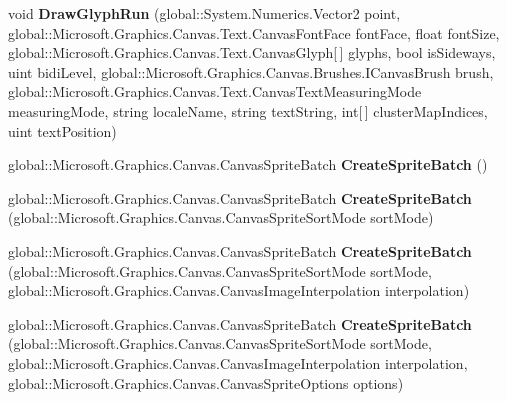 \begin{DoxyCompactItemize}
\item 
\mbox{\label{class_microsoft_1_1_graphics_1_1_canvas_1_1_canvas_drawing_session_a7141cc7174254e70e51c28b9e7c914bf}} 
void {\bfseries Draw\+Glyph\+Run} (global\+::\+System.\+Numerics.\+Vector2 point, global\+::\+Microsoft.\+Graphics.\+Canvas.\+Text.\+Canvas\+Font\+Face font\+Face, float font\+Size, global\+::\+Microsoft.\+Graphics.\+Canvas.\+Text.\+Canvas\+Glyph\mbox{[}$\,$\mbox{]} glyphs, bool is\+Sideways, uint bidi\+Level, global\+::\+Microsoft.\+Graphics.\+Canvas.\+Brushes.\+I\+Canvas\+Brush brush, global\+::\+Microsoft.\+Graphics.\+Canvas.\+Text.\+Canvas\+Text\+Measuring\+Mode measuring\+Mode, string locale\+Name, string text\+String, int\mbox{[}$\,$\mbox{]} cluster\+Map\+Indices, uint text\+Position)
\item 
\mbox{\label{class_microsoft_1_1_graphics_1_1_canvas_1_1_canvas_drawing_session_a1538a697e0b86bca6f7c150533eb5171}} 
global\+::\+Microsoft.\+Graphics.\+Canvas.\+Canvas\+Sprite\+Batch {\bfseries Create\+Sprite\+Batch} ()
\item 
\mbox{\label{class_microsoft_1_1_graphics_1_1_canvas_1_1_canvas_drawing_session_a2a90318aeea5371614e41e51b53a0a02}} 
global\+::\+Microsoft.\+Graphics.\+Canvas.\+Canvas\+Sprite\+Batch {\bfseries Create\+Sprite\+Batch} (global\+::\+Microsoft.\+Graphics.\+Canvas.\+Canvas\+Sprite\+Sort\+Mode sort\+Mode)
\item 
\mbox{\label{class_microsoft_1_1_graphics_1_1_canvas_1_1_canvas_drawing_session_af03c7fa9272225a4aa04141c79381dbe}} 
global\+::\+Microsoft.\+Graphics.\+Canvas.\+Canvas\+Sprite\+Batch {\bfseries Create\+Sprite\+Batch} (global\+::\+Microsoft.\+Graphics.\+Canvas.\+Canvas\+Sprite\+Sort\+Mode sort\+Mode, global\+::\+Microsoft.\+Graphics.\+Canvas.\+Canvas\+Image\+Interpolation interpolation)
\item 
\mbox{\label{class_microsoft_1_1_graphics_1_1_canvas_1_1_canvas_drawing_session_a4a164e8f14dacae16a1a20511ade806d}} 
global\+::\+Microsoft.\+Graphics.\+Canvas.\+Canvas\+Sprite\+Batch {\bfseries Create\+Sprite\+Batch} (global\+::\+Microsoft.\+Graphics.\+Canvas.\+Canvas\+Sprite\+Sort\+Mode sort\+Mode, global\+::\+Microsoft.\+Graphics.\+Canvas.\+Canvas\+Image\+Interpolation interpolation, global\+::\+Microsoft.\+Graphics.\+Canvas.\+Canvas\+Sprite\+Options options)

\end{DoxyCompactItemize}
